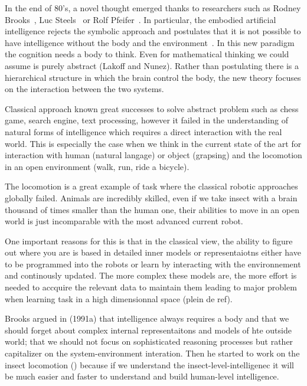 In the end of 80's, a novel thought emerged thanks to researchers such as Rodney Brooks~\cite{brooks1991intelligence}, Luc Steels~\cite{steels1995artificial} or Rolf Pfeifer~\cite{pfeifer2001understanding}. In particular, the embodied artificial intelligence rejects the symbolic approach and postulates that it is not possible to have intelligence without the body and the environment~\cite{pfeifer2001understanding}. In this new paradigm the cognition needs a body to think. Even for mathematical thinking we could assume is purely abstract (Lakoff and Nunez).
Rather than postulating there is a hierarchical structure in which the brain control the body, the new theory focuses on the interaction between the two systems.

Classical approach known great successes to solve abstract problem such as chess game, search engine, text processing, however it failed in the understanding of natural forms of intelligence which requires a direct interaction with the real world. This is especially the case when we think in the current state of the art for interaction with human (natural langage) or object (grapsing) and the locomotion in an open environment (walk,
run, ride a bicycle).

The locomotion is a great example of task where the classical robotic approaches globally failed. Animals are incredibly skilled, even if we take insect with a brain thousand of times smaller than the human one, their abilities to move in an open world is just incomparable with the most advanced current robot.

One important reasons for this is that in the classical view, the ability to figure out where you are is based in detailed inner models or representaiotns either have to be programmed into the robots or learn by interacting with the environnement and continously updated. The more complex these models are, the more effort is needed to accquire the relevant data to maintain them leading to major problem when learning task in a high dimensionnal space (plein de ref).

Brooks argued in (1991a) that intelligence always requires a body and that we should forget about complex internal representaitons and models of hte outside world; that we should not focus on sophisticated reasoning processes but rather capitalizer on the system-environment interation. Then he started to work on the insect locomotion () because if we understand the insect-level-intelligenec it will be much easier and faster to understand and build human-level intelligence.

